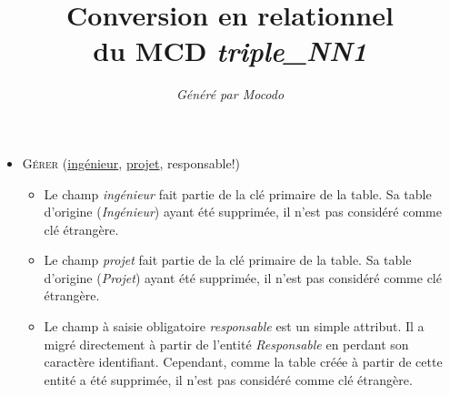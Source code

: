 \documentclass[a4paper]{article}
\title{Conversion en relationnel\\du MCD \emph{triple\_NN1}}
\author{\emph{Généré par Mocodo}}
\newcommand{\relat}[1]{\textsc{#1}}
\newcommand{\attr}[1]{#1}
\newcommand{\prim}[1]{\uline{#1}}
\begin{document}
\maketitle

\begin{itemize}
  \item \relat{Gérer} (\prim{ingénieur}, \prim{projet}, \attr{responsable!})
  \begin{itemize}
    \item Le champ \emph{ingénieur} fait partie de la clé primaire de la table. Sa table d'origine (\emph{Ingénieur}) ayant été supprimée, il n'est pas considéré comme clé étrangère.
    \item Le champ \emph{projet} fait partie de la clé primaire de la table. Sa table d'origine (\emph{Projet}) ayant été supprimée, il n'est pas considéré comme clé étrangère.
    \item Le champ à saisie obligatoire \emph{responsable} est un simple attribut. Il a migré directement à partir de l'entité \emph{Responsable} en perdant son caractère identifiant. Cependant, comme la table créée à partir de cette entité a été supprimée, il n'est pas considéré comme clé étrangère.
  \end{itemize}

\end{itemize}
\end{document}
